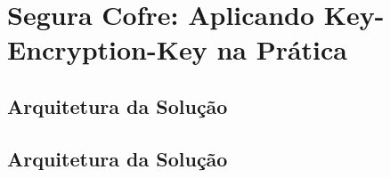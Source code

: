 \section{Segura Cofre: Aplicando Key-Encryption-Key na Prática}

\subsection{Arquitetura da Solução}

\subsection{Arquitetura da Solução}

\pagebreak
